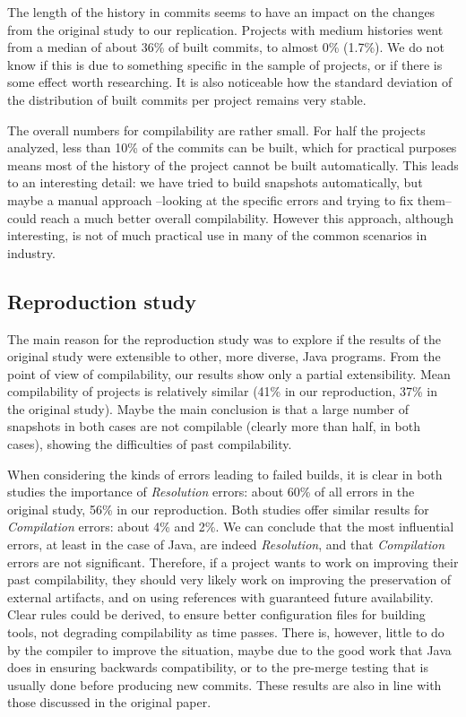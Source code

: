 The length of the history in commits seems to have an impact on the changes from the original study to our replication. Projects with medium histories went from a median of about 36\% of built commits, to almost 0\% (1.7\%). We do not know if this is due to something specific in the sample of projects, or if there is some effect worth researching. It is also noticeable how the standard deviation of the distribution of built commits per project remains very stable.   

The overall numbers for compilability are rather small. For half the projects analyzed, less than 10\% of the commits can be built, which for practical purposes means most of the history of the project cannot be built automatically. This leads to an interesting detail: we have tried to build snapshots automatically, but maybe a manual approach --looking at the specific errors and trying to fix them-- could reach a much better overall compilability. However this approach, although interesting, is not of much practical use in many of the common scenarios in industry.

\subsection{Reproduction study}

The main reason for the reproduction study was to explore if the results of the original study were extensible to other, more diverse, Java programs. From the point of view of compilability, our results show only a partial extensibility. Mean compilability of projects is relatively similar (41\% in our reproduction, 37\% in the original study). Maybe the main conclusion is that a large number of snapshots in both cases are not compilable (clearly more than half, in both cases), showing the difficulties of past compilability.

When considering the kinds of errors leading to failed builds, it is clear in both studies the importance of \textit{Resolution} errors: about 60\% of all errors in the original study, 56\% in our reproduction. Both studies offer similar results for \textit{Compilation} errors: about 4\% and 2\%. We can conclude that the most influential errors, at least in the case of Java, are indeed \textit{Resolution}, and that \textit{Compilation} errors are not significant. Therefore, if a project wants to work on improving their past compilability, they should very likely work on improving the preservation of external artifacts, and on using references with guaranteed future availability. Clear rules could be derived, to ensure better configuration files for building tools, not degrading compilability as time passes. There is, however, little to do by the compiler to improve the situation, maybe due to the good work that Java does in ensuring backwards compatibility, or to the pre-merge testing that is usually done before producing new commits. These results are also in line with those discussed in the original paper.

